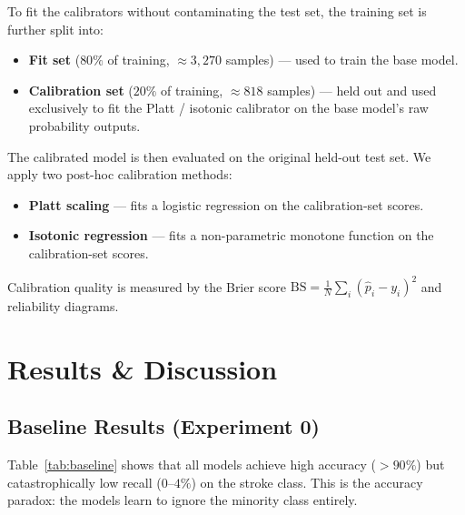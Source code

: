 \documentclass[11pt,a4paper]{article}
\begin{document}
To fit the calibrators without contaminating the test set, the training set is further split into:
\begin{itemize}
  \item \textbf{Fit set} ($80\%$ of training, $\approx\!3{,}270$ samples) — used to train the base model.
  \item \textbf{Calibration set} ($20\%$ of training, $\approx\!818$ samples) — held out and used exclusively to fit the Platt / isotonic calibrator on the base model's raw probability outputs.
\end{itemize}
The calibrated model is then evaluated on the original held-out test set.
We apply two post-hoc calibration methods:
\begin{itemize}
  \item \textbf{Platt scaling} — fits a logistic regression on the calibration-set scores.
  \item \textbf{Isotonic regression} — fits a non-parametric monotone function on the calibration-set scores.
\end{itemize}
Calibration quality is measured by the Brier score $\text{BS} = \frac{1}{N}\sum_i(\hat{p}_i - y_i)^2$ and reliability diagrams.

\section{Results \& Discussion}
\label{sec:results}

\subsection{Baseline Results (Experiment 0)}

Table~\ref{tab:baseline} shows that all models achieve high accuracy ($>\!90\%$) but catastrophically low recall ($0$–$4\%$) on the stroke class.
This is the accuracy paradox: the models learn to ignore the minority class entirely.
\end{document}
